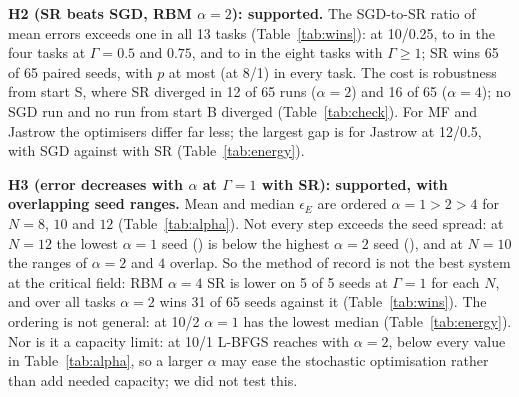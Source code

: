 \textbf{H2 (SR beats SGD, RBM $\alpha{=}2$): supported.} The SGD-to-SR ratio of mean errors exceeds one in all 13 tasks (Table~\ref{tab:wins}):  at 10/0.25,  to  in the four tasks at $\Gamma{=}0.5$ and $0.75$, and  to  in the eight tasks with $\Gamma\ge1$; SR wins 65 of 65 paired seeds, with $p$ at most  (at 8/1) in every task. The cost is robustness from start S, where SR diverged in 12 of 65 runs ($\alpha{=}2$) and 16 of 65 ($\alpha{=}4$); no SGD run and no run from start B diverged (Table~\ref{tab:check}). For MF and Jastrow the optimisers differ far less; the largest gap is for Jastrow at 12/0.5,  with SGD against  with SR (Table~\ref{tab:energy}).

\begin{table}[t]\centering\caption{RBM with SR at $\Gamma{=}1$, selected states: $\epsilon_E$ over 5 seeds.}\label{tab:alpha}\footnotesize\end{table}

\textbf{H3 (error decreases with $\alpha$ at $\Gamma{=}1$ with SR): supported, with overlapping seed ranges.} Mean and median $\epsilon_E$ are ordered $\alpha{=}1>2>4$ for $N=8$, $10$ and $12$ (Table~\ref{tab:alpha}). Not every step exceeds the seed spread: at $N{=}12$ the lowest $\alpha{=}1$ seed () is below the highest $\alpha{=}2$ seed (), and at $N{=}10$ the ranges of $\alpha{=}2$ and $4$ overlap. So the method of record is not the best system at the critical field: RBM $\alpha{=}4$ SR is lower on 5 of 5 seeds at $\Gamma{=}1$ for each $N$, and over all tasks $\alpha{=}2$ wins 31 of 65 seeds against it (Table~\ref{tab:wins}). The ordering is not general: at 10/2 $\alpha{=}1$ has the lowest median (Table~\ref{tab:energy}). Nor is it a capacity limit: at 10/1 L-BFGS reaches  with $\alpha{=}2$, below every value in Table~\ref{tab:alpha}, so a larger $\alpha$ may ease the stochastic optimisation rather than add needed capacity; we did not test this.

